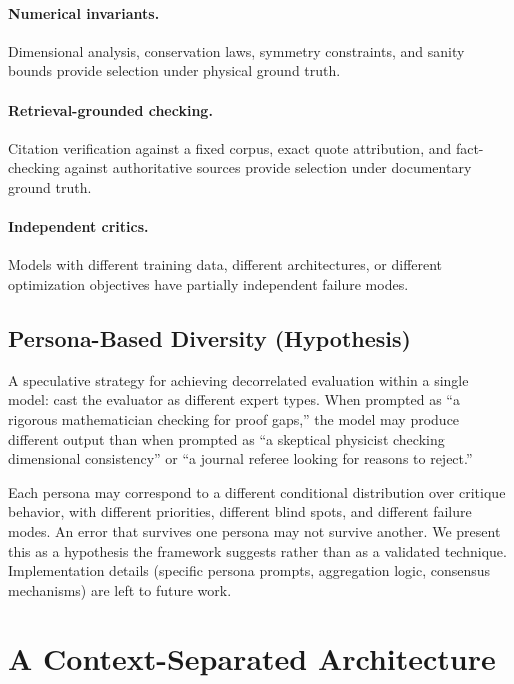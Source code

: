 \documentclass[11pt]{article}
\begin{document}
\paragraph{Numerical invariants.} Dimensional analysis, conservation laws, symmetry constraints, and sanity bounds provide selection under physical ground truth.

\paragraph{Retrieval-grounded checking.} Citation verification against a fixed corpus, exact quote attribution, and fact-checking against authoritative sources provide selection under documentary ground truth.

\paragraph{Independent critics.} Models with different training data, different architectures, or different optimization objectives have partially independent failure modes.

\subsection{Persona-Based Diversity (Hypothesis)}

A speculative strategy for achieving decorrelated evaluation within a single model: cast the evaluator as different expert types. When prompted as ``a rigorous mathematician checking for proof gaps,'' the model may produce different output than when prompted as ``a skeptical physicist checking dimensional consistency'' or ``a journal referee looking for reasons to reject.''

Each persona may correspond to a different conditional distribution over critique behavior, with different priorities, different blind spots, and different failure modes. An error that survives one persona may not survive another. We present this as a hypothesis the framework suggests rather than as a validated technique. Implementation details (specific persona prompts, aggregation logic, consensus mechanisms) are left to future work.

\section{A Context-Separated Architecture}
\end{document}
